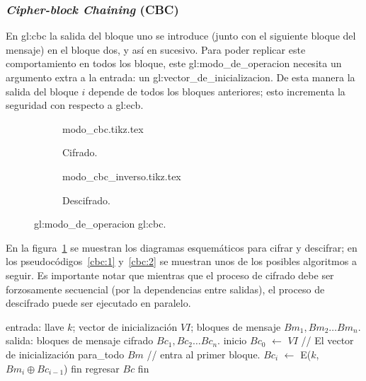 %
%

\subsubsection{\textit{Cipher-block Chaining} (CBC)}
\label{sec:cbc}

\nopagebreak[4]
En \gls{gl:cbc} la salida del bloque uno se introduce (junto con
el siguiente bloque del mensaje) en el bloque dos, y así en sucesivo.
Para poder replicar este comportamiento en todos los bloque, este
\gls{gl:modo_de_operacion} necesita un argumento extra a la entrada: un
\gls{gl:vector_de_inicializacion}. De esta manera la salida del bloque $ i $
depende de todos los bloques anteriores; esto incrementa la seguridad con
respecto a \gls{gl:ecb}.

\begin{figure}
  \centering
  \begin{subfigure}{0.45\textwidth}
    \begin{center}
      {modo_cbc.tikz.tex}
      \caption{Cifrado.}
    \end{center}
  \end{subfigure}
  \begin{subfigure}{0.45\textwidth}
    \begin{center}
      {modo_cbc_inverso.tikz.tex}
      \caption{Descifrado.}
    \end{center}
  \end{subfigure}
  \caption{\Gls{gl:modo_de_operacion} \gls{gl:cbc}.}
  \label{figura:cbc}
\end{figure}

En la figura~\ref{figura:cbc} se muestran los diagramas esquemáticos para
cifrar y descifrar; en los pseudocódigos~\ref{cbc:1} y~\ref{cbc:2} se muestran
unos de los posibles algoritmos a seguir. Es importante notar que mientras que
el proceso de cifrado debe ser forzosamente secuencial (por la dependencias
entre salidas), el proceso de descifrado puede ser ejecutado en paralelo.


\begin{pseudocodigo}[%
    caption={\Gls{gl:modo_de_operacion} \gls{gl:cbc}, cifrado.},
    label={cbc:1}%
  ]
    entrada: llave $ k $; vector de inicialización $ VI $;
             bloques de mensaje $ Bm_1, Bm_2 \dots Bm_n $.
    salida:  bloques de mensaje cifrado $ Bc_1, Bc_2 \dots Bc_n $.
    inicio
      $Bc_0$ $\gets$ $ VI $                        // El vector de inicialización
      para_todo $Bm$               // entra al primer bloque.
        $Bc_i$ $\gets$ E($k$, $Bm_i \oplus Bc_{i - 1}$)
      fin
      regresar $Bc$
    fin
\end{pseudocodigo}

